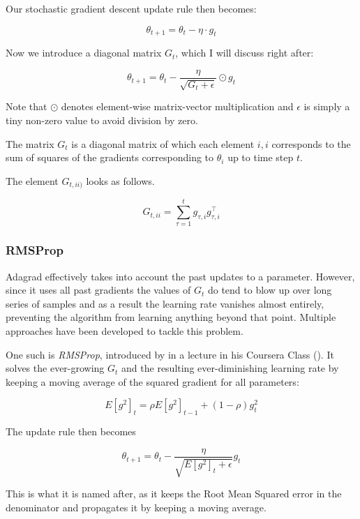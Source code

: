 Our stochastic gradient descent update rule then becomes:

\begin{equation}
  \theta_{t+1} = \theta_{t} - \eta \cdot g_{t}
\end{equation}

Now we introduce a diagonal matrix $G_t$,
which I will discuss right after:

\begin{equation}
  \theta_{t+1} = \theta_{t} - \frac{\eta}{\sqrt{G_t + \epsilon}} \odot g_{t}
\end{equation}

Note that $\odot$ denotes element-wise matrix-vector multiplication
and $\epsilon$ is simply a tiny non-zero value
to avoid division by zero.

The matrix $G_t$ is a diagonal matrix
of which each element $i,i$
corresponds to the sum of squares of the gradients
corresponding to $\theta_i$
up to time step $t$.

The element $G_{t, ii)}$ looks as follows.

\begin{equation}
  G_{t, ii} = \sum^t_{\tau=1}g_{\tau, i} g_{\tau, i}^\top
\end{equation}

\subsubsection{RMSProp}
Adagrad effectively takes into account
the past updates to a parameter.
However, since it uses all past gradients
the values of $G_t$ do tend to blow up over long
series of samples
and as a result the learning rate vanishes almost entirely,
preventing the algorithm from learning anything beyond that point.
Multiple approaches have been developed to tackle this problem.

One such is \textit{RMSProp},
introduced by \citeauthor{Hinton}
in a lecture in his Coursera Class (\citeyear{Hinton}).
It solves the ever-growing $G_t$
and the resulting ever-diminishing learning rate
by keeping a moving average of the squared gradient for all parameters:

\begin{equation}
  E[g^2]_t = \rho E[g^2]_{t-1} + (1-\rho) g^2_t
\end{equation}

The update rule then becomes

\begin{equation}
  \label{eq:rmsprop}
  \theta_{t+1} = \theta_{t} - \frac{\eta}{\sqrt{E[g^2]_t + \epsilon}} g_{t}
\end{equation}

This is what it is named after,
as it keeps the Root Mean Squared error in the denominator
and propagates it by keeping a moving average.
